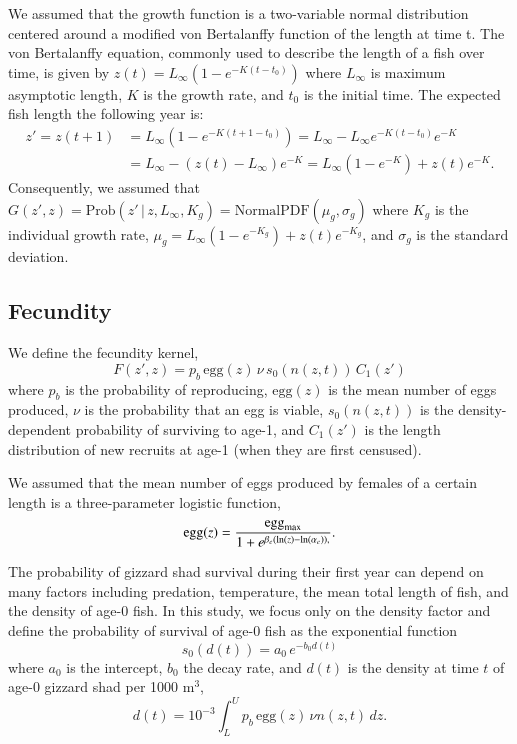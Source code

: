 \documentclass[preprint,review,12pt,authoryear]{elsarticle}
\def\ds{\displaystyle}
\begin{document}
We assumed that the growth function is a two-variable normal distribution centered around a modified von Bertalanffy function of the length at time t. 
The von Bertalanffy equation, commonly used to describe the length of a fish over time, is given by $\ds z(t) = L_{\infty} \left(1-e^{-K(t-t_0)} \right)$ where $L_\infty$ is maximum asymptotic length, $K$ is the growth rate, and $t_0$ is the initial time. 
The expected fish length the following year is:
\begin{align*}
 z' =z(t+1) & =  L_{\infty} \left(1-e^{-K(t+1-t_0)} \right) =  L_{\infty} - L_{\infty}e^{-K(t-t_0)} e^{-K} \\
 & =   L_\infty - \left( z(t)-L_\infty \right) e^{-K} =   L_{\infty} \left(1-e^{-K} \right) + z(t)e^{-K}. 
 \end{align*}
Consequently, we assumed that 
$\ds G(z',z) = \mathrm{Prob}(z' \, | \,  z, L_{\infty}, K_g) = \mathrm{Normal PDF}(\mu_g, \sigma_g)$
where $K_g$ is the individual growth rate, $\mu_g =  L_{\infty} \left(1-e^{-K_g} \right) + z(t)e^{-K_g}$, and $\sigma_g$ is the standard deviation.

\subsection{Fecundity}
We define the fecundity kernel, 
\begin{equation}\label{eq:fecundity}
F(z', z) = p_b \, \mbox{egg}(z) \, \nu \, s_0(n(z,t)) \, C_1(z')
\end{equation}
where $p_b$ is the probability of reproducing, $\mbox{egg}(z)$ is the mean number of eggs produced, $\nu$ is the probability that an egg is viable, $s_0(n(z,t))$ is the density-dependent probability of surviving to age-1, and $C_1 (z')$ is the length distribution of new recruits at age-1 (when they are first censused).

We assumed that the mean number of eggs produced by females of a certain length is a three-parameter logistic function,
\begin{equation}\label{eq:egg}
\mbox{egg}(z) = \frac{\mbox{egg}_{\rm max}}{1+e^{\beta_e(\ln(z)-\ln(\alpha_e)),}}.
\end{equation}

The probability of gizzard shad survival during their first year can depend on many factors \citep{michaletz2010overwinter} including predation, temperature, the mean total length of fish, and the density of age-0 fish.  
In this study, we focus only on the density factor and define the probability of survival of age-0 fish as the exponential function
\begin{equation}\label{eq:s0}
s_0(d(t)) = a_0 \, e^{-b_0 d(t)}
\end{equation}
where $a_0$ is the intercept, $b_0$ the decay rate, and $d(t)$ is the density at time $t$ of age-0 gizzard shad per 1000 m$^3$, 
\[ d(t) = 10^{-3} \int_L^U p_b \, \mbox{egg}(z) \, \nu n(z,t) \, dz. \]  
\end{document}
